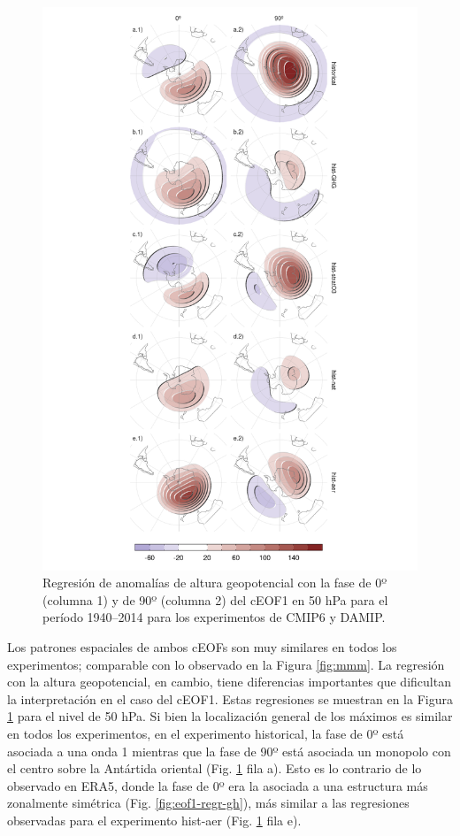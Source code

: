 \documentclass[12pt,oneside,a4paper]{reedthesis}
\begin{document}
\begin{figure}

{\centering \includegraphics{figures/50-cmip6/regresion-hgt-damip-1} 

}

\caption{Regresión de anomalías de altura geopotencial con la fase de 0º (columna 1) y de 90º (columna 2) del cEOF1 en 50 hPa para el período 1940--2014 para los experimentos de CMIP6 y DAMIP.}\label{fig:regresion-hgt-damip}
\end{figure}



Los patrones espaciales de ambos cEOFs son muy similares en todos los experimentos; comparable con lo observado en la Figura \ref{fig:mmm}.
La regresión con la altura geopotencial, en cambio, tiene diferencias importantes que dificultan la interpretación en el caso del cEOF1.
Estas regresiones se muestran en la Figura \ref{fig:regresion-hgt-damip} para el nivel de 50 hPa.
Si bien la localización general de los máximos es similar en todos los experimentos, en el experimento historical, la fase de 0º está asociada a una onda 1 mientras que la fase de 90º está asociada un monopolo con el centro sobre la Antártida oriental (Fig. \ref{fig:regresion-hgt-damip} fila a).
Esto es lo contrario de lo observado en ERA5, donde la fase de 0º era la asociada a una estructura más zonalmente simétrica (Fig. \ref{fig:eof1-regr-gh}), más similar a las regresiones observadas para el experimento hist-aer (Fig. \ref{fig:regresion-hgt-damip} fila e).
\end{document}
